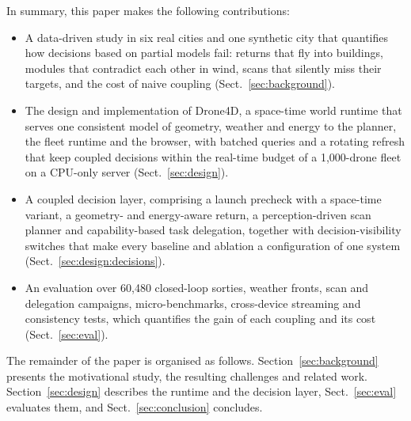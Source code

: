 In summary, this paper makes the following contributions:
\begin{itemize}
\item A data-driven study in six real cities and one synthetic city that quantifies how decisions based on partial
models fail: returns that fly into buildings, modules that contradict each other in wind, scans that silently miss their
targets, and the cost of naive coupling (Sect.~\ref{sec:background}).
\item The design and implementation of Drone4D, a space-time world runtime that serves one consistent model of geometry, weather and
energy to the planner, the fleet runtime and the browser, with batched queries and a rotating refresh that keep coupled
decisions within the real-time budget of a 1,000-drone fleet on a CPU-only server (Sect.~\ref{sec:design}).
\item A coupled decision layer, comprising a launch precheck with a space-time variant, a geometry- and energy-aware
return, a perception-driven scan planner and capability-based task delegation, together with decision-visibility
switches that make every baseline and ablation a configuration of one system (Sect.~\ref{sec:design:decisions}).
\item An evaluation over 60,480 closed-loop sorties, weather fronts, scan and delegation campaigns, micro-benchmarks,
cross-device streaming and consistency tests, which quantifies the gain of each coupling and its cost
(Sect.~\ref{sec:eval}).
\end{itemize}

The remainder of the paper is organised as follows. Section~\ref{sec:background} presents the motivational study, the
resulting challenges and related work. Section~\ref{sec:design} describes the runtime and the decision layer,
Sect.~\ref{sec:eval} evaluates them, and Sect.~\ref{sec:conclusion} concludes.
